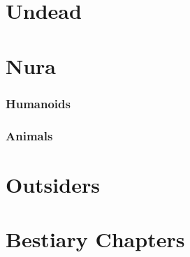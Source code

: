 \documentclass{report}
\begin{document}
\chapter{Undead}

\begin{multicols}{2}

\ghoul

\ghast

\demilich

\lich

\end{multicols}

\chapter{Nura}

\begin{multicols}{2}

\subsection{Humanoids}

\goblin

\goblin

\goblinnuramancer

\hobgoblin

\ogre

\subsection{Animals}

\nurahorse

\nuracrab

\nuracat

\nuraslug

\nuraspider

\nurawolf

\chapter{Outsiders}

\archmage

\archmage

\dragon

\rockman

\end{multicols}

\chapter{Bestiary Chapters}
\end{document}

